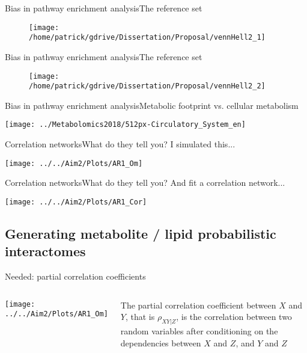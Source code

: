 \documentclass[xcolor=dvipsnames]{beamer}
\begin{document}
\begin{frame}{Bias in pathway enrichment analysis}{The reference set}
	\vspace{-15.5pt}
	\begin{figure}
		\texttt{[image: /home/patrick/gdrive/Dissertation/Proposal/vennHell2\_1]}
	\end{figure}
\end{frame}

\begin{frame}{Bias in pathway enrichment analysis}{The reference set}
	\vspace{-15.5pt}
	\begin{figure}
		\texttt{[image: /home/patrick/gdrive/Dissertation/Proposal/vennHell2\_2]}
	\end{figure}
\addtocounter{framenumber}{-1}
\end{frame}

\begin{frame}{Bias in pathway enrichment analysis}{Metabolic footprint vs. cellular metabolism}
\vspace{-10.5pt}
	\begin{center}
		\texttt{[image: ../Metabolomics2018/512px-Circulatory\_System\_en]}
	\end{center}
\end{frame}

\begin{frame}{Correlation networks}{What do they tell you?}
	{I simulated this...}
	\begin{center}
		\texttt{[image: ../../Aim2/Plots/AR1\_Om]}
	\end{center}
\end{frame}

\begin{frame}{Correlation networks}{What do they tell you?}
	{And fit a correlation network...}
	\begin{center}
		\texttt{[image: ../../Aim2/Plots/AR1\_Cor]}
	\end{center}
\end{frame}

\subsection{Generating metabolite / lipid probabilistic interactomes}

\begin{frame}{Needed: partial correlation coefficients}
\begin{columns}
	\vspace{-15 pt}
	\begin{center}
		\texttt{[image: ../../Aim2/Plots/AR1\_Om]}
	\end{center}
 The partial correlation coefficient between $X$ and $Y$, that is $\rho_{XY|Z}$, is the correlation between two random variables after conditioning on the dependencies between $X$ and $Z$, and $Y$ and $Z$ 
\end{columns}
\end{frame}
\end{document}
